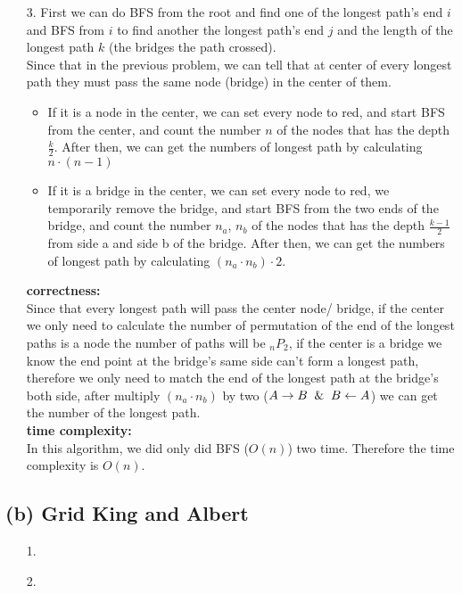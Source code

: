 \documentclass{homework}
\begin{document}
\begin{itemize}
    \item[3.]
    First we can do BFS from the root and find one of the longest path's end $i$ and BFS from $i$ to find another the longest path's end $j$ and the length of the longest path $k$ (the bridges the path crossed).\\
    Since that in the previous problem, we can tell that at center of every longest path they must pass the same node (bridge) in the center of them.\\
    \begin{itemize}
        \item If it is a node in the center, we can set every node to red, and start BFS from the center, and count the number $n$ of the nodes that has the depth $\frac{k}{2}$. After then, we can get the numbers of longest path by calculating $n\cdot(n-1)$
        \item If it is a bridge in the center, we can set every node to red, we temporarily remove the bridge, and start BFS from the two ends of the bridge, and count the number $n_a$, $n_b$ of the nodes that has the depth $\frac{k-1}{2}$ from side a and side b of the bridge. After then, we can get the numbers of longest path by calculating $(n_a \cdot n_b) \cdot 2$.
    \end{itemize}
    
    \textbf{correctness:}\\
    Since that every longest path will pass the center node/ bridge, if the center we only need to calculate the number of permutation of the end of the longest paths is a node the number of paths will be $_n P_2$, if the center is a bridge we know the end point at the bridge's same side can't form a longest path, therefore we only need to match the end of the longest path at the bridge's both side, after multiply $(n_a \cdot n_b)$ by two ($A\rightarrow B \And B\leftarrow A$) we can get the number of the longest path. \\
    \textbf{time complexity:}\\
    In this algorithm, we did only did BFS ($O(n)$) two time. Therefore the time complexity is $O(n)$.\\
\clearpage
\end{itemize}
\subsection*{(b) Grid King and Albert}
\begin{itemize}
    \item[1.]
\clearpage
    \item[2.]
\clearpage
\end{itemize}
\end{document}
